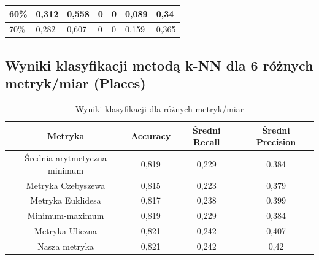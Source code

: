 \documentclass{classrep}
\begin{document}
{\begin{table}[h]
\begin{center}
\begin{tabular}{|l|l|l|l|l|l|l|}
60\%                                                              & 0,312                                                        & 0,558                                                            & 0                                                                 & 0                                                                    & 0,089                                                            & 0,34                     \\ \hline
70\%                                                              & 0,282                                                        & 0,607                                                            & 0                                                                 & 0                                                                    & 0,159                                                            & 0,365                    \\ \hline
\end{tabular}
\end{center}
\end{table}

\subsection{Wyniki klasyfikacji metodą k-NN dla 6 różnych metryk/miar (Places)}

\begin{table}[h]
\begin{center}
\caption{Wyniki klasyfikacji dla różnych metryk/miar}
\begin{tabular}{|c|c|c|c|}
\hline
\textbf{Metryka}             & \textbf{Accuracy} & \textbf{Średni Recall} & \textbf{Średni Precision} \\ \hline
Średnia arytmetyczna minimum & 0,819             & 0,229                  & 0,384                     \\ \hline
Metryka Czebyszewa           & 0,815             & 0,223                  & 0,379                     \\ \hline
Metryka Euklidesa            & 0,817             & 0,238                  & 0,399                     \\ \hline
Minimum-maximum              & 0,819             & 0,229                  & 0,384                     \\ \hline
Metryka Uliczna              & 0,821             & 0,242                  & 0,407                     \\ \hline
Nasza metryka                & 0,821             & 0,242                  & 0,42                      \\ \hline
\end{tabular}
\end{center}
\end{table}

}
\end{document}
